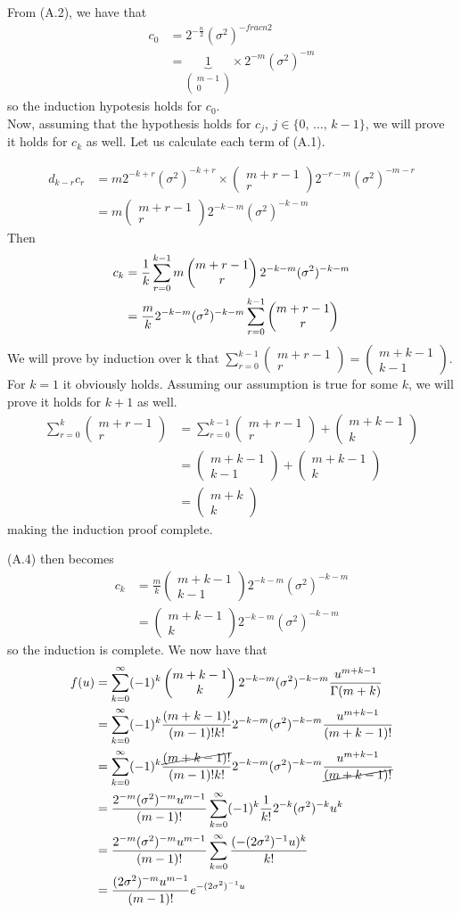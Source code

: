 \documentclass[12pt]{report}
\newcommand{\sumlim}[3]{\sum\limits_{#1 = #2}^{#3}}
\newcommand{\ub}{\underbrace}
\newcommand{\comb}[2]{\begin{pmatrix}#1 \\ #2\end{pmatrix}}
\begin{document}
From (A.2), we have that
\begin{align*}
    c_0 &= 2^{-\frac{n}{2}}(\sigma^2)^{-frac{n}{2}} \\
    &= \ub{1}_{\comb{m-1}{0}} \times 2^{-m}(\sigma^2)^{-m}
\end{align*}
so the induction hypotesis holds for $c_0$. \\

Now, assuming that the hypothesis holds for $c_j,\,j\in\{0,\,\dots,\,k-1\}$, we will prove it holds for $c_k$ as well. Let us calculate each term of (A.1).

\begin{align*}
    d_{k-r}c_r &= m2^{-k+r}(\sigma^2)^{-k+r} \times \comb{m+r-1}{r}2^{-r-m}(\sigma^2)^{-m-r} \\
    &= m\comb{m+r-1}{r} 2^{-k-m}(\sigma^2)^{-k-m} 
\end{align*}
Then
\begin{align}
    c_k &= \frac{1}{k}\sumlim{r}{0}{k-1}m\comb{m+r-1}{r} 2^{-k-m}(\sigma^2)^{-k-m} \notag\\
    &= \frac{m}{k}2^{-k-m}(\sigma^2)^{-k-m}\sumlim{r}{0}{k-1}\comb{m+r-1}{r}  \\
\end{align}
We will prove by induction over k that $\sumlim{r}{0}{k-1}\comb{m+r-1}{r} = \comb{m+k-1}{k-1}$. For $k = 1$ it obviously holds. Assuming our assumption is true for some $k$, we will prove it holds for $k+1$ as well.
\begin{align*}
    \sumlim{r}{0}{k}\comb{m+r-1}{r} &= \sumlim{r}{0}{k-1}\comb{m+r-1}{r} + \comb{m+k-1}{k} \\
    &= \comb{m+k-1}{k-1} + \comb{m+k-1}{k} \\
    &= \comb{m+k}{k}
\end{align*}
making the induction proof complete.

(A.4) then becomes
\begin{align*}
    c_k &= \frac{m}{k}\comb{m+k-1}{k-1}2^{-k-m}(\sigma^2)^{-k-m} \\
    &= \comb{m+k-1}{k}2^{-k-m}(\sigma^2)^{-k-m}
\end{align*}
so the induction is complete. We now have that
\begin{align*}
    f(u) &= \sumlim{k}{0}{\infty}(-1)^k\comb{m+k-1}{k}2^{-k-m}(\sigma^2)^{-k-m}\frac{u^{m+k-1}}{\Gamma(m+k)} \\
    &= \sumlim{k}{0}{\infty}(-1)^k\frac{(m+k-1)!}{(m-1)!k!}2^{-k-m}(\sigma^2)^{-k-m}\frac{u^{m+k-1}}{(m+k-1)!} \\
    &= \sumlim{k}{0}{\infty}(-1)^k\frac{\cancel{(m+k-1)!}}{(m-1)!k!}2^{-k-m}(\sigma^2)^{-k-m}\frac{u^{m+k-1}}{\cancel{(m+k-1)!}} \\
    &= \frac{2^{-m}(\sigma^2)^{-m}u^{m-1}}{(m-1)!}\sumlim{k}{0}{\infty}(-1)^k\frac{1}{k!}2^{-k}(\sigma^2)^{-k}u^{k} \\
    &= \frac{2^{-m}(\sigma^2)^{-m}u^{m-1}}{(m-1)!}\sumlim{k}{0}{\infty}\frac{(-(2\sigma^2)^{-1}u)^k}{k!} \\
    &= \frac{(2\sigma^2)^{-m}u^{m-1}}{(m-1)!}e^{-(2\sigma^2)^{-1}u}
\end{align*}
\end{document}
